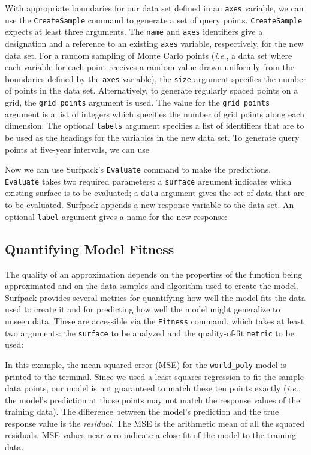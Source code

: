 \documentclass{article}
\begin{document}
With appropriate boundaries for our data set defined in an \texttt{axes} variable, we can use the \texttt{CreateSample} command to generate a set of query points.  \texttt{CreateSample} expects at least three arguments.  The \texttt{name} and \texttt{axes} identifiers give a designation and a reference to an existing \texttt{axes} variable, respectively, for the new data set.  For a random sampling of Monte Carlo points ({\em i.e.}, a data set where each variable for each point receives a random value drawn uniformly from the boundaries defined by the \texttt{axes} variable), the \texttt{size} argument specifies the number of points in the data set.  Alternatively, to generate regularly spaced points on a grid, the \texttt{grid\_points} argument is used.  The value for the \texttt{grid\_points} argument is a list of integers which specifies the number of grid points along each dimension.  The optional \texttt{labels} argument specifies a list of identifiers that are to be used as the headings for the variables in the new data set.  To generate query points at five-year intervals, we can use

  
Now we can use Surfpack's \texttt{Evaluate} command to make the predictions.  \texttt{Evaluate} takes two required parameters: a \texttt{surface} argument indicates which existing surface is to be  evaluated; a \texttt{data} argument gives the set of data that are to be evaluated.  Surfpack appends a new response variable to the data set.  An optional \texttt{label} argument gives a name for the new response:     


\subsection{Quantifying Model Fitness}\label{sec:fitness}
The quality of an approximation depends on the properties of
the function being approximated and on the data samples and algorithm used to
create the model.  Surfpack provides several metrics for quantifying how well
the model fits the data used to create it and for predicting how well the model
might generalize to unseen data.  These are accessible via the \texttt{Fitness} command,
which takes at least two arguments: the \texttt{surface} to be analyzed
and the quality-of-fit \texttt{metric} to be used:

In this example, the mean squared error (MSE) for the \texttt{world\_poly} model is printed to the terminal.  Since we used a least-squares regression to fit the sample data points, our model is not guaranteed to match these ten points exactly ({\em i.e.}, the model's prediction at those points may not match the response values of the training data).
The difference between the model's prediction and the true response value is the {\em residual}.  The MSE is the arithmetic
mean of all the squared residuals.  MSE values near zero indicate a close fit of the model to the
training data.
\end{document}
